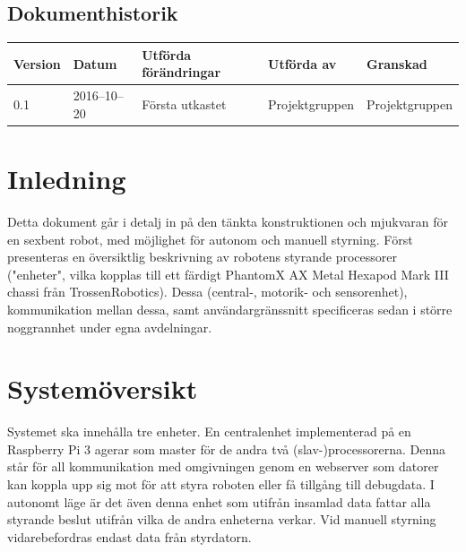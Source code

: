 \documentclass[a4paper,titlepage,12pt]{article}
\begin{document}
\begin{center}

		\section*{Dokumenthistorik}
		\renewcommand*{\arraystretch}{1.4}
        \begin{longtable}[c]{ l l >{\raggedright}p{5cm} >{\raggedright}p{3cm} l }
			\textbf{Version} & \textbf{Datum} & \textbf{Utförda förändringar} 
			& \textbf{Utförda av} & \textbf{Granskad} \\ \midrule
			
			0.1 & 2016--10--20 & Första utkastet & Projektgruppen &
            Projektgruppen \\
            
		\end{longtable}
	\end{center}


	\newpage

	\raggedright

	\section{Inledning}
	Detta dokument går i detalj in på den tänkta konstruktionen och mjukvaran för en 
	sexbent robot, med möjlighet för autonom och manuell styrning. Först presenteras en 
	översiktlig beskrivning av robotens styrande processorer ("enheter", vilka kopplas till ett färdigt 
	PhantomX AX Metal Hexapod Mark III chassi från TrossenRobotics). Dessa (central-, 
	motorik- och sensorenhet), kommunikation mellan dessa, samt användargränssnitt specificeras 
	sedan i större noggrannhet under egna avdelningar.


	\section{Systemöversikt}
	Systemet ska innehålla tre enheter. En centralenhet implementerad på en Raspberry Pi 3 
	agerar som master för de andra två (slav-)processorerna. Denna står för all kommunikation 
	med omgivningen genom en webserver som datorer kan koppla upp sig mot för att styra roboten 
	eller få tillgång till debugdata. I autonomt läge är det även denna enhet som utifrån 
	insamlad data fattar alla styrande beslut utifrån vilka de andra enheterna
  verkar. Vid manuell styrning vidarebefordras endast data från styrdatorn.
\end{document}
